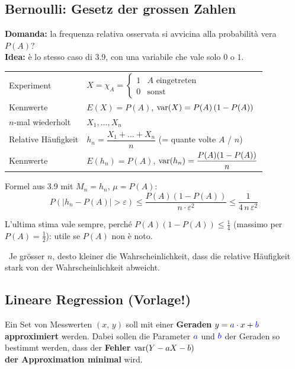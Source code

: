 \subsection{Bernoulli: Gesetz der grossen Zahlen}

\textbf{Domanda:} la frequenza relativa osservata si avvicina alla probabilità vera $P(A)$? \\
\textbf{Idea:} è lo stesso caso di 3.9, con una variabile che vale solo $0$ o $1$.

\begin{tabular}{@{}ll@{}}
	Experiment		& $X = \chi_A = \begin{cases} 1 & A \text{ eingetreten} \\ 0 & \text{sonst} \end{cases}$ \\[0.6em]
	Kennwerte		& $E(X) = P(A)$, \quad $\mathrm{var}(X) = P(A)\,(1-P(A))$ \\[0.3em]
	$n$-mal wiederholt	& $X_1, \ldots, X_n$ \\[0.3em]
	Relative Häufigkeit	& $h_n = \dfrac{X_1 + \ldots + X_n}{n}$ \quad (= quante volte $A$ / $n$) \\[0.6em]
	Kennwerte		& $E(h_n) = P(A)$, \quad $\mathrm{var}(h_n) = \dfrac{P(A)(1-P(A))}{n}$
\end{tabular}

\medskip
Formel aus 3.9 mit $M_n = h_n$, $\mu = P(A)$:
$$ \boxed{ P( | h_n - P(A) | > \varepsilon ) \leq \frac{P(A)(1-P(A))}{ n \cdot \varepsilon^2} \leq \frac{1}{4 \, n \, \varepsilon^2} } $$

\small L'ultima stima vale sempre, perché $P(A)(1-P(A)) \leq \tfrac14$ (massimo per $P(A) = \tfrac12$): utile se $P(A)$ non è noto. \normalsize

\textrightarrow\ Je grösser $n$, desto kleiner die Wahrscheinlichkeit, dass die relative Häufigkeit stark von der Wahrscheinlichkeit abweicht.


\subsection{Lineare Regression (Vorlage!)}

Ein Set von Messwerten $(x, \, y)$ soll mit einer \textbf{Geraden} $y = {\color{blue}a} \cdot x + {\color{blue}b}$ \textbf{approximiert} werden. 
Dabei sollen die Parameter ${\color{blue}a}$ und ${\color{blue}b}$ der Geraden so bestimmt werden, dass der \textbf{Fehler  $\mathrm{var}(Y-aX-b)$ \\ 
der Approximation minimal} wird.

\vspace{0.2cm}

